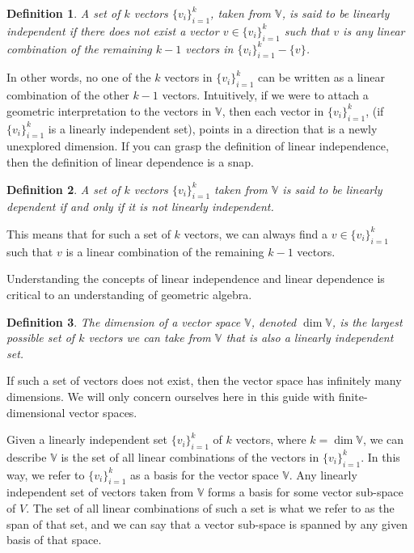 \documentclass[12pt]{article}
\numberwithin{equation}{section}
\newcommand{\V}{\mathbb{V}}
\newtheorem{definition}{Definition}[section]
\begin{document}
\begin{definition}
A set of $k$ vectors $\{v_i\}_{i=1}^k$, taken from $\V$, is said to be linearly
independent if there does not exist a vector $v\in\{v_i\}_{i=1}^k$ such that
$v$ is any linear combination of the remaining $k-1$ vectors in $\{v_i\}_{i=1}^k-\{v\}$.
\end{definition}

In other words, no one of the $k$ vectors in $\{v_i\}_{i=1}^k$ can be
written as a linear combination of the other $k-1$ vectors.  Intuitively, if
we were to attach a geometric interpretation to the vectors in $\V$, then
each vector in $\{v_i\}_{i=1}^k$, (if $\{v_i\}_{i=1}^k$ is a linearly independent set), points
in a direction that is a newly unexplored dimension.  If you can grasp the
definition of linear independence, then the definition of linear dependence
is a snap.

\begin{definition}
A set of $k$ vectors $\{v_i\}_{i=1}^k$ taken from $\V$ is said to be linearly
dependent if and only if it is not linearly independent.
\end{definition}

This means that for such a set of $k$ vectors, we can always find a $v\in\{v_i\}_{i=1}^k$
such that $v$ is a linear combination of the remaining $k-1$ vectors.

Understanding the concepts of linear independence and linear dependence is
critical to an understanding of geometric algebra.

\begin{definition}
The dimension of a vector space $\V$, denoted $\dim\V$, is the largest
possible set of $k$ vectors we can take from $\V$ that is also a linearly
independent set.
\end{definition}

If such a set of vectors does not exist, then the vector space has
infinitely many dimensions.  We will only concern ourselves here in this
guide with finite-dimensional vector spaces.

Given a linearly independent set $\{v_i\}_{i=1}^k$ of $k$ vectors, where $k=\dim\V$,
we can describe $\V$ is the set of all linear combinations of the vectors in $\{v_i\}_{i=1}^k$.
In this way, we refer to $\{v_i\}_{i=1}^k$ as a basis for the vector space $\V$.
Any linearly independent set of vectors taken from $\V$ forms a basis for some
vector sub-space of $V$.  The set of all linear combinations of such a set is
what we refer to as the span of that set, and we can say that a vector sub-space
is spanned by any given basis of that space.
\end{document}
